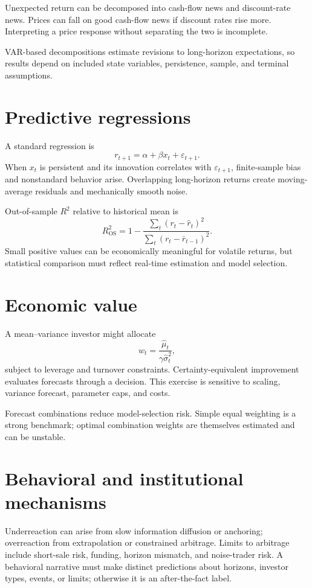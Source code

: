Unexpected return can be decomposed into cash-flow news and discount-rate news.
Prices can fall on good cash-flow news if discount rates rise more. Interpreting a
price response without separating the two is incomplete.

VAR-based decompositions estimate revisions to long-horizon expectations, so results
depend on included state variables, persistence, sample, and terminal assumptions.

\section{Predictive regressions}

A standard regression is
\[
r_{t+1}=\alpha+\beta x_t+\varepsilon_{t+1}.
\]
When $x_t$ is persistent and its innovation correlates with $\varepsilon_{t+1}$,
finite-sample bias and nonstandard behavior arise. Overlapping long-horizon returns
create moving-average residuals and mechanically smooth noise.

Out-of-sample $R^2$ relative to historical mean is
\[
R^2_{\mathrm{OS}}=
1-\frac{\sum_t(r_t-\widehat r_t)^2}
{\sum_t(r_t-\bar r_{t-1})^2}.
\]
Small positive values can be economically meaningful for volatile returns, but
statistical comparison must reflect real-time estimation and model selection.

\section{Economic value}

A mean--variance investor might allocate
\[
w_t=\frac{\widehat\mu_t}{\gamma\widehat\sigma_t^2},
\]
subject to leverage and turnover constraints. Certainty-equivalent improvement
evaluates forecasts through a decision. This exercise is sensitive to scaling,
variance forecast, parameter caps, and costs.

Forecast combinations reduce model-selection risk. Simple equal weighting is a
strong benchmark; optimal combination weights are themselves estimated and can be
unstable.

\section{Behavioral and institutional mechanisms}

Underreaction can arise from slow information diffusion or anchoring; overreaction
from extrapolation or constrained arbitrage. Limits to arbitrage include short-sale
risk, funding, horizon mismatch, and noise-trader risk. A behavioral narrative must
make distinct predictions about horizons, investor types, events, or limits; otherwise
it is an after-the-fact label.

